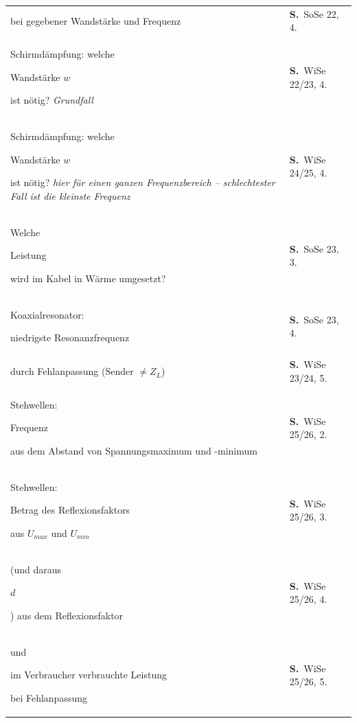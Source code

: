 \documentclass[a4paper,10pt]{article}
\newcommand{\gs}[1]{{\setlength{\fboxsep}{0.5mm}%
  \colorbox{MarkerG!45}{\strut #1}}}
\begin{document}
\begin{tabularx}{\textwidth}{@{}>{\RaggedRight}X>{\RaggedRight\scriptsize}p{27mm}@{}}
\gs{Schirmdämpfung in dB} bei gegebener Wandstärke und Frequenz & \textbf{S.\,\pageref{tf:SoSe22:1:4}} \textcolor{Grau}{SoSe 22, 4.} \\
Schirmdämpfung: welche \gs{Wandstärke $w$} ist nötig? \newline \hspace*{3mm}\textcolor{Grau}{\itshape \textendash{} Grundfall} & \textbf{S.\,\pageref{tf:WiSe22x23:1:4}} \textcolor{Grau}{WiSe 22/23, 4.} \\
Schirmdämpfung: welche \gs{Wandstärke $w$} ist nötig? \newline \hspace*{3mm}\textcolor{Grau}{\itshape \textendash{} hier für einen ganzen Frequenzbereich -- schlechtester Fall ist die kleinste Frequenz} & \textbf{S.\,\pageref{tf:WiSe24y25:1:4}} \textcolor{Grau}{WiSe 24/25, 4.} \\
Welche \gs{Leistung} wird im Kabel in Wärme umgesetzt? & \textbf{S.\,\pageref{tf:SoSe23:1:3}} \textcolor{Grau}{SoSe 23, 3.} \\
Koaxialresonator: \gs{niedrigste Resonanzfrequenz} & \textbf{S.\,\pageref{tf:SoSe23:1:4}} \textcolor{Grau}{SoSe 23, 4.} \\
\gs{Zusatzverluste} durch Fehlanpassung (Sender $\neq Z_L$) & \textbf{S.\,\pageref{tf:WiSe23x24:1:5}} \textcolor{Grau}{WiSe 23/24, 5.} \\
Stehwellen: \gs{Frequenz} aus dem Abstand von Spannungsmaximum und -minimum & \textbf{S.\,\pageref{tf:WiSe25y26:1:2}} \textcolor{Grau}{WiSe 25/26, 2.} \\
Stehwellen: \gs{Betrag des Reflexionsfaktors} aus $U_{max}$ und $U_{min}$ & \textbf{S.\,\pageref{tf:WiSe25y26:1:3}} \textcolor{Grau}{WiSe 25/26, 3.} \\
\gs{$Z_L$} (und daraus \gs{$d$}) aus dem Reflexionsfaktor & \textbf{S.\,\pageref{tf:WiSe25y26:1:4}} \textcolor{Grau}{WiSe 25/26, 4.} \\
\gs{Eingespeiste} und \gs{im Verbraucher verbrauchte Leistung} bei Fehlanpassung & \textbf{S.\,\pageref{tf:WiSe25y26:1:5}} \textcolor{Grau}{WiSe 25/26, 5.} \\
\hline\end{tabularx}\normalsize
\par\vspace{5mm}
\end{document}
